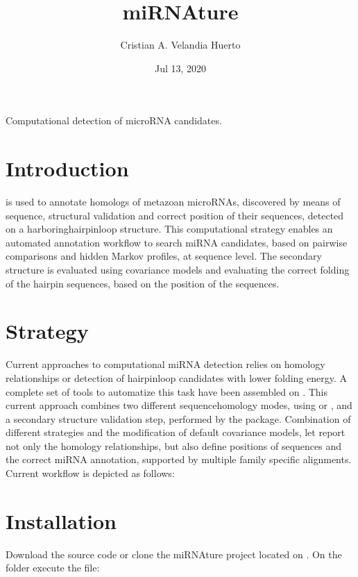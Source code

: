 \documentclass[letterpaper,10pt,english]{sphinxmanual}
\title{miRNAture}
\date{Jul 13, 2020}
\author{Cristian A.\@{} Velandia Huerto}
\let\sphinxpxdimen\pdfpxdimen\else\newdimen\sphinxpxdimen
\begin{document}
\pagestyle{empty}
\sphinxmaketitle
\pagestyle{plain}
\sphinxtableofcontents
\pagestyle{normal}
\label{\detokenize{index::doc}}


Computational detection of microRNA candidates.


\chapter{Introduction}
\label{\detokenize{includeme:introduction}}
 is used to annotate homologs of metazoan microRNAs, discovered by means of
sequence, structural validation and correct position of their  sequences,
detected on a harboring\sphinxhyphen{}hairpin\sphinxhyphen{}loop structure. This computational strategy enables
an automated annotation workflow to search  miRNA candidates, based
on pairwise comparisons and hidden Markov profiles, at sequence level. The
secondary structure is evaluated using covariance models and evaluating the
correct folding of the hairpin sequences, based on the position of the 
sequences.


\chapter{Strategy}
\label{\detokenize{includeme:strategy}}
Current approaches to computational miRNA detection relies on homology relationships
or detection of hairpin\sphinxhyphen{}loop candidates with lower folding energy. A complete set of
tools to automatize this task have been assembled on . This current
approach combines two different sequence\sphinxhyphen{}homology modes, using  or , and
a secondary structure validation step, performed by the  package. Combination
of different strategies and the modification of default covariance models, let 
report not only the homology relationships, but also define positions of  sequences
and the correct miRNA annotation, supported by multiple family specific alignments.
Current workflow is depicted as follows:

\noindent\sphinxincludegraphics[width=600\sphinxpxdimen]{{mirnature}.png}


\chapter{Installation}
\label{\detokenize{includeme:installation}}
Download the source code or clone the miRNAture project located on .
On the  folder execute the file:
\end{document}
